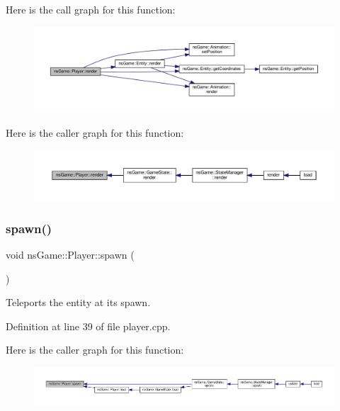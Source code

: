 Here is the call graph for this function\+:\nopagebreak
\begin{figure}[H]
\begin{center}
\leavevmode
\includegraphics[width=350pt]{classns_game_1_1_player_a34b359a72d3dbdf537c72161898376f3_cgraph}
\end{center}
\end{figure}
Here is the caller graph for this function\+:\nopagebreak
\begin{figure}[H]
\begin{center}
\leavevmode
\includegraphics[width=350pt]{classns_game_1_1_player_a34b359a72d3dbdf537c72161898376f3_icgraph}
\end{center}
\end{figure}
\mbox{\label{classns_game_1_1_player_acab2fb26d3c0dddadccf7fcfc17b6e79}} 
\subsubsection{\texorpdfstring{spawn()}{spawn()}}
{\footnotesize\ttfamily void ns\+Game\+::\+Player\+::spawn (\begin{DoxyParamCaption}{ }\end{DoxyParamCaption})}



Teleports the entity at its spawn. 



Definition at line 39 of file player.\+cpp.

Here is the caller graph for this function\+:\nopagebreak
\begin{figure}[H]
\begin{center}
\leavevmode
\includegraphics[width=350pt]{classns_game_1_1_player_acab2fb26d3c0dddadccf7fcfc17b6e79_icgraph}
\end{center}
\end{figure}
\mbox{\label{classns_game_1_1_player_a8702d56a2f8651a53511b4dbea30d0f6}} 
